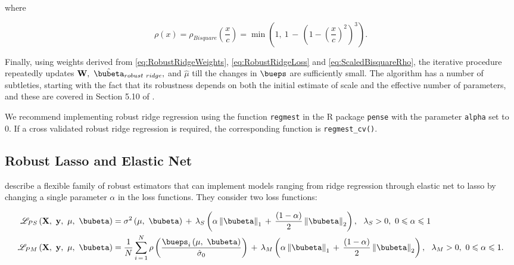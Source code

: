 \documentclass[graybox,envcountchap,sectrefs]{svmono}\usepackage[]{graphicx}\usepackage[]{xcolor}
\begin{document}
\begin{appendices}
where 

\begin{equation}
\rho(x)=\rho_{Bisquare}\left(\frac{x}{c}\right)=\min\left(1,\ 1\,-\,\left(1-\left(\frac{x}{c}\right)^{2}\right)^{3}\right).\label{eq:ScaledBisquareRho}
\end{equation}

Finally, using weights derived from \eqref{eq:RobustRidgeWeights},
\eqref{eq:RobustRidgeLoss} and \eqref{eq:ScaledBisquareRho}, the
iterative procedure repeatedly updates $\mathbf{W},\ \hat{\bubeta}_{robust\ ridge},$
and $\hat{\mu}$ till the changes in $\bueps$ are sufficiently small.
The algorithm has a number of subtleties, starting with the fact that
its robustness depends on both the initial estimate of scale and the
effective number of parameters, and these are covered in Section 5.10
of \citet{Maronna2019}.

We recommend implementing robust ridge regression using the function
\texttt{regmest} in the R package \texttt{pense} with the parameter
\texttt{alpha} set to 0. If a cross validated robust ridge regression
is required, the corresponding function is \texttt{regmest\_cv()}. 

\subsection{Robust Lasso and Elastic Net}

\citet{FreueKepplingerSalibianSmucler2019} describe a flexible family
of robust estimators that can implement models ranging from ridge
regression through elastic net to lasso by changing a single parameter
$\alpha$ in the loss functions. They consider two loss functions:

\begin{subequations}
\begin{align}
\mathscr{L}_{PS}\left(\mathbf{X},\ \mathbf{y},\ \mu,\ \bubeta\right) & =\sigma^{2}\left(\mu,\ \bubeta\right)\,+\,\lambda_{S}\left(\alpha\left\Vert \bubeta\right\Vert _{1}\,+\,\frac{\left(1-\alpha\right)}{2}\left\Vert \bubeta\right\Vert _{2}\right),\ \ \lambda_{S}>0,\ 0\leqslant\alpha\leqslant1\label{eq:SestimatorLoss}\\
\mathscr{L}_{PM}\left(\mathbf{X},\ \mathbf{y},\ \mu,\ \bubeta\right) & =\frac{1}{N}\sum_{i\,=\,1}^{N}\rho\left(\frac{\bueps_{i}\left(\mu,\ \bubeta\right)}{\hat{\sigma}_{0}}\right)\,+\,\lambda_{M}\left(\alpha\left\Vert \bubeta\right\Vert _{1}\,+\,\frac{\left(1-\alpha\right)}{2}\left\Vert \bubeta\right\Vert _{2}\right),\ \ \lambda_{M}>0,\ 0\leqslant\alpha\leqslant1.\label{eq:MestimatorLoss}
\end{align}
\end{subequations}


\end{appendices}
\end{document}
